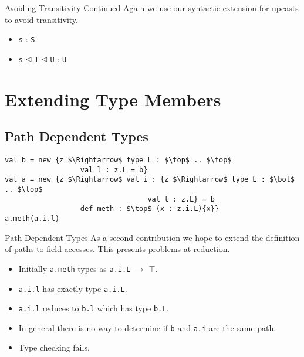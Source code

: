 \documentclass[dvipsnames]{beamer}
\begin{document}
\begin{frame}{Avoiding Transitivity Continued}
Again we use our syntactic extension for upcasts to avoid transitivity.
\begin{itemize}
\item
\texttt{s} : \texttt{S}
\item
\texttt{s} $\unlhd$ \texttt{T} $\unlhd$ \texttt{U} : \texttt{U}
\end{itemize}
\end{frame}

\section{Extending Type Members}

\subsection{Path Dependent Types}


\begin{lrbox}{\tmExPaths}
\begin{lstlisting}[mathescape, style=customlang]
val b = new {z $\Rightarrow$ type L : $\top$ .. $\top$
                  val l : z.L = b}
val a = new {z $\Rightarrow$ val i : {z $\Rightarrow$ type L : $\bot$ .. $\top$
                                  val l : z.L} = b
                  def meth : $\top$ (x : z.i.L){x}}
a.meth(a.i.l)
\end{lstlisting}
\end{lrbox}

\begin{frame}{Path Dependent Types}
As a second contribution we hope to extend the definition of paths to field accesses. This presents problems at reduction.
\begin{block}{ }
\usebox{\tmExPaths}
\end{block}
\begin{itemize}
\item
Initially \texttt{a.meth} types as \texttt{a.i.L} $\rightarrow$ $\top$.
\item
\texttt{a.i.l} has exactly type \texttt{a.i.L}.
\item
\texttt{a.i.l} reduces to \texttt{b.l} which has type \texttt{b.L}.
\item
In general there is no way to determine if \texttt{b} and \texttt{a.i} are the same path.
\item
Type checking fails.
\end{itemize}
\end{frame}
\end{document}
